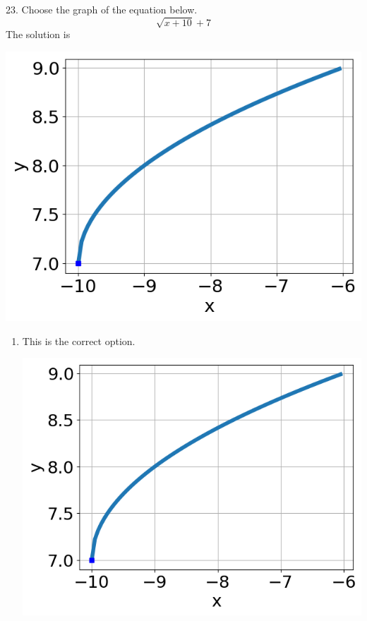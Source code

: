 \documentclass{article}[10pt]
\begin{document}
23. Choose the graph of the equation below.
$$ \sqrt{x + 10} + 7 $$ 
The solution is  
\begin{center}\includegraphics[scale=0.5]{../Figures/question23BD.png}\end{center}\begin{enumerate}[label=\Alph*.] 
\item This is the correct option. 
\begin{center}\includegraphics[scale=0.5]{../Figures/question23BD.png}\end{center} 
 

\end{enumerate}
\end{document}
